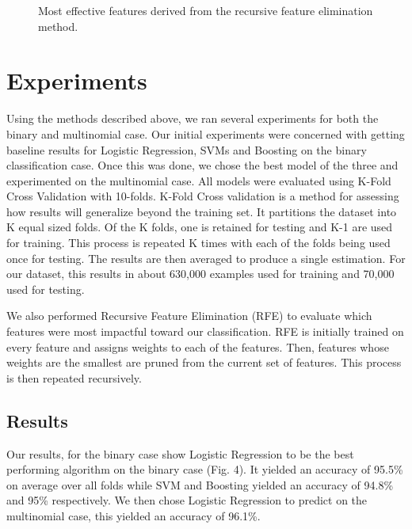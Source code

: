 \documentclass[conference]{IEEEtran}
\begin{document}
\begin{figure}[!htb]
\begin{center}
\end{center}
\caption{Most effective features derived from the recursive feature elimination method.}
\end{figure}

\section{Experiments}

Using the methods described above, we ran several experiments for both the binary and multinomial case. Our initial experiments were concerned with getting baseline results for Logistic Regression, SVMs and Boosting on the binary classification case. Once this was done, we chose the best model of the three and experimented on the multinomial case. All models were evaluated using K-Fold Cross Validation with 10-folds. K-Fold Cross validation is a method for assessing how results will generalize beyond the training set. It partitions the dataset into K equal sized folds. Of the K folds, one is retained for testing and K-1 are used for training. This process is repeated K times with each of the folds being used once for testing. The results are then averaged to produce a single estimation. For our dataset, this results in about 630,000 examples used for training and 70,000 used for testing.


We also performed Recursive Feature Elimination (RFE) to evaluate which features were most impactful toward our classification. RFE is initially trained on every feature and assigns weights to each of the features. Then, features whose weights are the smallest are pruned from the current set of features. This process is then repeated recursively.

\subsection{Results}
Our results, for the binary case show Logistic Regression to be the best performing algorithm on the binary case (Fig. 4). It yielded an accuracy of 95.5\% on average over all folds while SVM and Boosting yielded an accuracy of 94.8\% and 95\% respectively. We then chose Logistic Regression to predict on the multinomial case, this yielded an accuracy of 96.1\%.
\end{document}

